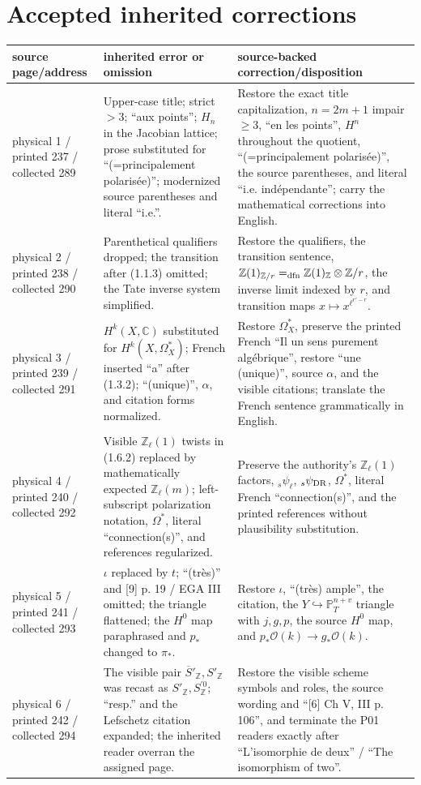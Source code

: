 \documentclass[10pt]{article}
\newcommand{\C}{\mathbb C}
\newcommand{\Pj}{\mathbb P}
\newcommand{\Z}{\mathbb Z}
\begin{document}
\section*{Accepted inherited corrections}
\small
\begin{longtable}{>{\raggedright\arraybackslash}p{.19\linewidth}>{\raggedright\arraybackslash}p{.35\linewidth}>{\raggedright\arraybackslash}p{.38\linewidth}}
\textbf{source page/address}&\textbf{inherited error or omission}&\textbf{source-backed correction/disposition}\\\hline

physical 1 / printed 237 / collected 289 & Upper-case title; strict $>3$; ``aux points''; $H_n$ in the Jacobian lattice; prose substituted for ``(=principalement polarisée)''; modernized source parentheses and literal ``i.e.''. & Restore the exact title capitalization, $n=2m+1$ impair $\geq3$, ``en les points'', $H^n$ throughout the quotient, ``(=principalement polarisée)'', the source parentheses, and literal ``i.e. indépendante''; carry the mathematical corrections into English.\\
physical 2 / printed 238 / collected 290 & Parenthetical qualifiers dropped; the transition after (1.1.3) omitted; the Tate inverse system simplified. & Restore the qualifiers, the transition sentence, $\Z(1)_{\Z/r}=_{\rm dfn}\Z(1)_\Z\otimes\Z/r$, the inverse limit indexed by $r$, and transition maps $x\mapsto x^{\ell^{r'-r}}$.\\
physical 3 / printed 239 / collected 291 & $H^k(X,\C)$ substituted for $H^k(X,\Omega_X^*)$; French inserted ``a'' after (1.3.2); ``(unique)'', $\alpha$, and citation forms normalized. & Restore $\Omega_X^*$, preserve the printed French ``Il un sens purement algébrique'', restore ``une (unique)'', source $\alpha$, and the visible citations; translate the French sentence grammatically in English.\\
physical 4 / printed 240 / collected 292 & Visible $\Z_\ell(1)$ twists in (1.6.2) replaced by mathematically expected $\Z_\ell(m)$; left-subscript polarization notation, $\Omega^*$, literal ``connection(s)'', and references regularized. & Preserve the authority's $\Z_\ell(1)$ factors, ${}_s\psi_\ell$, ${}_s\psi_{\rm DR}$, $\Omega^*$, literal French ``connection(s)'', and the printed references without plausibility substitution.\\
physical 5 / printed 241 / collected 293 & $\iota$ replaced by $t$; ``(très)'' and [9] p. 19 / EGA III omitted; the triangle flattened; the $H^0$ map paraphrased and $p_*$ changed to $\pi_*$. & Restore $\iota$, ``(très) ample'', the citation, the $Y\hookrightarrow\Pj_T^{n+v}$ triangle with $j,g,p$, the source $H^0$ map, and $p_*\mathcal O(k)\to g_*\mathcal O(k)$.\\
physical 6 / printed 242 / collected 294 & The visible pair $\overline S'_\Z,S'_\Z$ was recast as $S'_\Z,S_\Z^{\prime0}$; ``resp.'' and the Lefschetz citation expanded; the inherited reader overran the assigned page. & Restore the visible scheme symbols and roles, the source wording and ``[6] Ch V, III p. 106'', and terminate the P01 readers exactly after ``L'isomorphie de deux'' / ``The isomorphism of two''.\\


\end{longtable}
\end{document}
